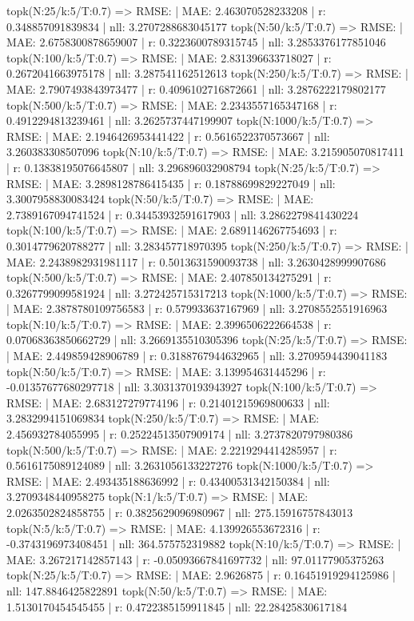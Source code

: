 topk(N:25/k:5/T:0.7) => RMSE: | MAE: 2.463070528233208 | r: 0.348857091839834 | nll: 3.2707288683045177
topk(N:50/k:5/T:0.7) => RMSE: | MAE: 2.6758300878659007 | r: 0.3223600789315745 | nll: 3.2853376177851046
topk(N:100/k:5/T:0.7) => RMSE: | MAE: 2.831396633718027 | r: 0.2672041663975178 | nll: 3.287541162512613
topk(N:250/k:5/T:0.7) => RMSE: | MAE: 2.7907493843973477 | r: 0.4096102716872661 | nll: 3.2876222179802177
topk(N:500/k:5/T:0.7) => RMSE: | MAE: 2.2343557165347168 | r: 0.4912294813239461 | nll: 3.2625737447199907
topk(N:1000/k:5/T:0.7) => RMSE: | MAE: 2.1946426953441422 | r: 0.5616522370573667 | nll: 3.260383308507096
topk(N:10/k:5/T:0.7) => RMSE: | MAE: 3.215905070817411 | r: 0.13838195076645807 | nll: 3.296896032908794
topk(N:25/k:5/T:0.7) => RMSE: | MAE: 3.2898128786415435 | r: 0.18788699829227049 | nll: 3.3007958830083424
topk(N:50/k:5/T:0.7) => RMSE: | MAE: 2.7389167094741524 | r: 0.34453932591617903 | nll: 3.2862279841430224
topk(N:100/k:5/T:0.7) => RMSE: | MAE: 2.6891146267754693 | r: 0.3014779620788277 | nll: 3.283457718970395
topk(N:250/k:5/T:0.7) => RMSE: | MAE: 2.2438982931981117 | r: 0.5013631590093738 | nll: 3.2630428999907686
topk(N:500/k:5/T:0.7) => RMSE: | MAE: 2.407850134275291 | r: 0.3267799099581924 | nll: 3.272425715317213
topk(N:1000/k:5/T:0.7) => RMSE: | MAE: 2.3878780109756583 | r: 0.579933637167969 | nll: 3.2708552551916963
topk(N:10/k:5/T:0.7) => RMSE: | MAE: 2.3996506222664538 | r: 0.07068363850662729 | nll: 3.2669135510305396
topk(N:25/k:5/T:0.7) => RMSE: | MAE: 2.449859428906789 | r: 0.3188767944632965 | nll: 3.2709594439041183
topk(N:50/k:5/T:0.7) => RMSE: | MAE: 3.139954631445296 | r: -0.01357677680297718 | nll: 3.3031370193943927
topk(N:100/k:5/T:0.7) => RMSE: | MAE: 2.683127279774196 | r: 0.21401215969800633 | nll: 3.2832994151069834
topk(N:250/k:5/T:0.7) => RMSE: | MAE: 2.456932784055995 | r: 0.25224513507909174 | nll: 3.2737820797980386
topk(N:500/k:5/T:0.7) => RMSE: | MAE: 2.2219294414285957 | r: 0.5616175089124089 | nll: 3.2631056133227276
topk(N:1000/k:5/T:0.7) => RMSE: | MAE: 2.493435188636992 | r: 0.43400531342150384 | nll: 3.2709348440958275
topk(N:1/k:5/T:0.7) => RMSE: | MAE: 2.0263502824858755 | r: 0.3825629096980967 | nll: 275.15916757843013
topk(N:5/k:5/T:0.7) => RMSE: | MAE: 4.139926553672316 | r: -0.3743196973408451 | nll: 364.575752319882
topk(N:10/k:5/T:0.7) => RMSE: | MAE: 3.267217142857143 | r: -0.05093667841697732 | nll: 97.01177905375263
topk(N:25/k:5/T:0.7) => RMSE: | MAE: 2.9626875 | r: 0.16451919294125986 | nll: 147.8846425822891
topk(N:50/k:5/T:0.7) => RMSE: | MAE: 1.5130170454545455 | r: 0.4722385159911845 | nll: 22.28425830617184
